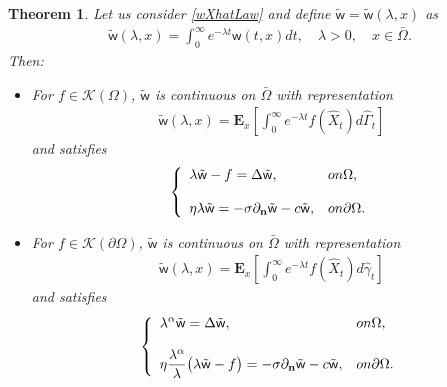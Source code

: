 \documentclass[11pt,a4paper]{article}
\newtheorem{theorem}{Theorem}[section]
\begin{document}
\begin{theorem}
Let us consider \eqref{wXhatLaw} and define $\tilde{\mathsf{w}}=\tilde{\mathsf{w}}(\lambda, x)$ as
\begin{align*}
\tilde{\mathsf{w}} (\lambda, x) = \int_0^\infty e^{-\lambda t} \mathsf{w}(t,x) dt, \quad \lambda >0, \quad x \in \bar{\Omega}.
\end{align*}
Then:
\begin{itemize}
\item[i)] For $f \in \mathcal{K}(\Omega)$, $\tilde{\mathsf{w}}$ is continuous on $\bar{\Omega}$ with representation
\begin{align*}
\tilde{\mathsf{w}}(\lambda,x) = \mathbf{E}_x\left[ \int_0^\infty e^{-\lambda t} f(\hat{X}_t) d\hat{\Gamma}_t \right]
\end{align*}
and satisfies
\begin{equation}
\label{pr1wHatLaw}
\left\lbrace
\begin{array}{ll}
\displaystyle \lambda \tilde{\mathsf{w}} - f = \Delta \tilde{\mathsf{w}}, &  \textrm{on } \Omega,\\
\\
\displaystyle \eta \lambda \tilde{\mathsf{w}} = - \sigma \partial_{\bf n} \tilde{\mathsf{w}} - c \tilde{\mathsf{w}}, & \textrm{on } \partial \Omega.
\end{array}
\right.
\end{equation}
\item[ii)] For $f \in \mathcal{K}(\partial \Omega)$, $\tilde{\mathsf{w}}$ is continuous on $\bar{\Omega}$ with representation
\begin{align*}
\tilde{\mathsf{w}}(\lambda, x) = \mathbf{E}_x\left[ \int_0^\infty e^{-\lambda t} f(\hat{X}_t) d\hat{\gamma}_t \right]
\end{align*}
and satisfies
\begin{equation}
\label{pr2wHatLaw}
\left\lbrace
\begin{array}{ll}
\displaystyle \lambda^\alpha \tilde{\mathsf{w}}  = \Delta \tilde{\mathsf{w}}, & \textrm{on } \Omega,\\
\\
\displaystyle \eta \frac{\lambda^\alpha}{\lambda} \big( \lambda \tilde{\mathsf{w}} - f \big) = - \sigma \partial_{\bf n}\tilde{\mathsf{w}} - c \tilde{\mathsf{w}}, & \textrm{on } \partial\Omega.
\end{array}
\right.
\end{equation}
\end{itemize}
\label{thm:alternativPap}
\end{theorem}
\end{document}
